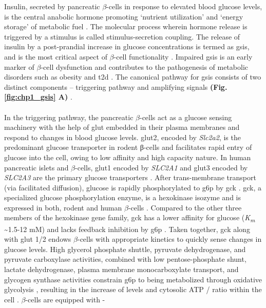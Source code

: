 Insulin, secreted by pancreatic $\beta$-cells in response to elevated blood glucose levels, is the central anabolic hormone promoting `nutrient utilization' and `energy storage' of metabolic fuel \textbf{\cite{slack_developmental_1995}}. The molecular process wherein hormone release is triggered by a stimulus is called stimulus-secretion coupling.  The release of insulin by a post-prandial increase in glucose concentrations is termed as \gls{gsis}, and is the most critical aspect of $\beta$-cell functionality \textbf{\cite{ashcroft_stimulussecretion_1994}}.  Impaired \gls{gsis} is an early marker of $\beta$-cell dysfunction and contributes to the pathogenesis of metabolic disorders such as obesity and \gls{t2d} \textbf{\cite{jensen_metabolic_2008}}. The canonical pathway for \gls{gsis} consists of two distinct components – triggering pathway and amplifying signals \textbf{(Fig. \ref{fig:chp1_gsis} A)} \textbf{\cite{henquin_triggering_2000}}. 
\\\\
In the triggering pathway, the pancreatic $\beta$-cells act as a glucose sensing machinery with the help of \gls{glut} embedded in their plasma membranes and respond to changes in blood glucose levels. \gls{glut}2, encoded by \textit{Slc2a2}, is the predominant glucose transporter in rodent β-cells \textbf{\cite{mcculloch_glut2_2011,van_de_bunt_tale_2012}} and facilitates rapid entry of glucose into the cell, owing to low affinity and high capacity nature. In human pancreatic islets and $\beta$-cells, \gls{glut}1 encoded by \textit{SLC2A1} and \gls{glut}3 encoded by \textit{SLC2A3} are the primary glucose transporters \textbf{\cite{mcculloch_glut2_2011}}. After trans-membrane transport (via facilitated diffusion), glucose is rapidly phosphorylated to \gls{g6p} by \gls{gck} \textbf{\cite{campbell_mechanisms_2021,matschinsky_central_2019}}. \gls{gck}, a specialized glucose phosphorylation enzyme, is a hexokinase isozyme and is expressed in both, rodent and human $\beta$-cells \textbf{\cite{campbell_mechanisms_2021}}. Compared to the other three members of the hexokinase gene family, \gls{gck} has a lower affinity for glucose (\textit{K\textsubscript{m}} \textasciitilde 1.5-12 mM) and lacks feedback inhibition by \gls{g6p} \textbf{\cite{matschinsky_central_2019}}. Taken together, \gls{gck} along with \gls{glut} 1/2 endows $\beta$-cells with appropriate kinetics to quickly sense changes in glucose levels. High glycerol phosphate shuttle, pyruvate dehydrogenase, and pyruvate carboxylase activities, combined with low pentose-phosphate shunt, lactate dehydrogenase, plasma membrane monocarboxylate transport, and glycogen synthase activities constrain \gls{g6p} to being metabolized through oxidative glycolysis \textbf{\cite{matschinsky_central_2019}}, resulting in the increase of  levels and cytosolic ATP /  ratio within the cell \textbf{\cite{henquin_triggering_2000}}. $\beta$-cells are equipped with -

